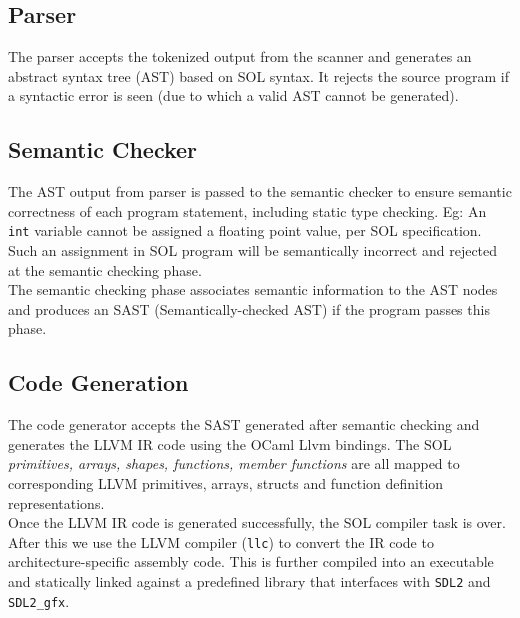 \documentclass[letterpaper,12pt]{report}
\begin{document}
    \subsection{Parser}
      The parser accepts the tokenized output from the scanner and generates an abstract syntax tree (AST) based on SOL syntax. It rejects the source program if a syntactic error is seen (due to which a valid AST cannot be generated).

    \subsection{Semantic Checker}
      The AST output from parser is passed to the semantic checker to ensure semantic correctness of each program statement, including static type checking. Eg: An \texttt{int} variable cannot be assigned a floating point value, per SOL specification. Such an assignment in SOL program will be semantically incorrect and rejected at the semantic checking phase.\\
      The semantic checking phase associates semantic information to the AST nodes and produces an SAST (Semantically-checked AST) if the program passes this phase.

    \subsection{Code Generation}
    The code generator accepts the SAST generated after semantic checking and generates the LLVM IR code using the OCaml Llvm bindings. The SOL \textit{primitives, arrays, shapes, functions, member functions} are all mapped to corresponding LLVM primitives, arrays, structs and function definition representations.\\
    Once the LLVM IR code is generated successfully, the SOL compiler task is over. After this we use the LLVM compiler (\texttt{llc}) to convert the IR code to architecture-specific assembly code. This is further compiled into an executable and statically linked against a predefined library that interfaces with \texttt{SDL2} and \texttt{SDL2\_gfx}. 
\end{document}
